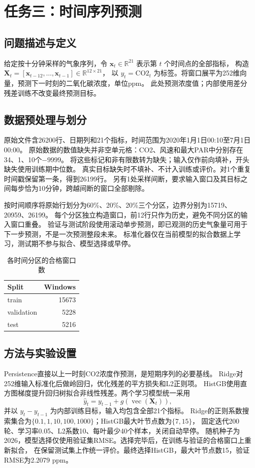 \section{任务三：时间序列预测}
\subsection{问题描述与定义}
给定按十分钟采样的气象序列，令 $\mathbf{x}_t\in\mathbb{R}^{21}$ 表示第 $t$ 个时间点的全部指标，
构造 $\mathbf{X}_t=[\mathbf{x}_{t-12},\ldots,\mathbf{x}_{t-1}]\in\mathbb{R}^{12\times21}$，
以 $y_t=\mathrm{CO2}_t$ 为标签。将窗口展平为252维向量，预测下一时刻的二氧化碳浓度，单位ppm。
此处预测浓度值；内部使用差分残差训练不改变最终预测目标。

\subsection{数据预处理与划分}
原始文件含26200行、日期列和21个指标，时间范围为2020年1月1日00:10至7月1日00:00。
原始数据的数值缺失并非空单元格：CO2、风速和最大PAR中分别存在34、1、10个$-9999$。
将这些标记和非有限数转为缺失；输入仅作前向填补，开头缺失使用训练期中位数。
真实目标缺失时不填补、不计入训练或评价。对1个重复时间戳保留第一条，得到26199行。
另有1处采样间断，要求输入窗口及其目标之间每步恰为10分钟，跨越间断的窗口全部剔除。

按时间顺序将原始行划分为60\%、20\%、20\%三个分区，边界分别为15719、20959、26199。
每个分区独立构造窗口，前12行只作为历史，避免不同分区的输入窗口重叠。
验证与测试阶段使用滚动单步预测，即已观测的历史气象量可用于下一步预测，不是一次预测整段未来。
标准化器仅在当前模型的拟合数据上学习，测试期不参与拟合、模型选择或早停。
\begin{table}[tbp]\caption{各时间分区的合格窗口数}\label{tab:m3split}\centering
\setlength{\tabcolsep}{3pt}\begin{tabular}{lr}
\toprule
Split & Windows\\
\midrule
train & 15673\\
validation & 5228\\
test & 5216\\
\bottomrule\end{tabular}\end{table}
\subsection{方法与实验设置}
Persistence直接以上一时刻CO2浓度作预测，是短期序列的必要基线。
Ridge对252维输入标准化后做岭回归，优化残差的平方损失和L2正则项。
HistGB使用直方图梯度提升回归树拟合非线性残差。两个学习模型统一采用
\begin{equation}
 \widehat y_t=y_{t-1}+g(\operatorname{vec}(\mathbf X_t)),
\end{equation}
并以 $y_t-y_{t-1}$ 为内部训练目标，输入均包含全部21个指标。
Ridge的正则系数搜索集合为$\{0.1,1,10,100,1000\}$；HistGB最大叶节点数为$\{7,15\}$，
固定迭代200轮、学习率0.05、L2系数10、每叶最少40个样本，关闭自动早停。
随机种子为2026，模型选择仅使用验证集RMSE。选择完毕后，在训练与验证的合格窗口上重新拟合，
在保留测试集上作统一评价。最终选择HistGB，最大叶节点数15，验证RMSE为2.2079 ppm。

